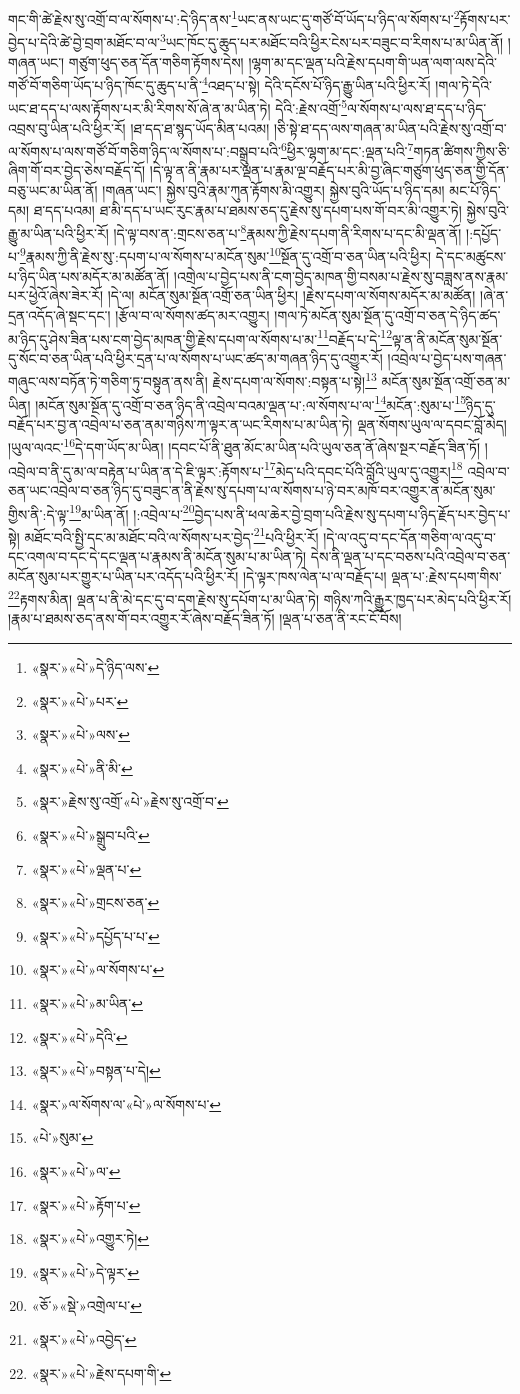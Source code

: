 གང་གི་ཚེ་རྗེས་སུ་འགྲོ་བ་ལ་སོགས་པ་:དེ་ཉིད་ནས་\footnote{«སྣར་»«པེ་»དེ་ཉིད་ལས་}ཡང་ནས་ཡང་དུ་གཙོ་བོ་ཡོད་པ་ཉིད་ལ་སོགས་པ་\footnote{«སྣར་»«པེ་»པར་}རྟོགས་པར་བྱེད་པ་དེའི་ཚེ་བྱེ་བྲག་མཐོང་བ་ལ་\footnote{«སྣར་»«པེ་»ལས་}ཡང་ཁོང་དུ་ཆུད་པར་མཐོང་བའི་ཕྱིར་ངེས་པར་བཟུང་བ་རིགས་པ་མ་ཡིན་ནོ། །གཞན་ཡང་། གཙུག་ཕུད་ཅན་དོན་གཅིག་རྟོགས་དེས། །ལྷག་མ་དང་ལྡན་པའི་རྗེས་དཔག་གི་ཡན་ལག་ལས་དེའི་གཙོ་བོ་གཅིག་ཡོད་པ་ཉིད་ཁོང་དུ་ཆུད་པ་ནི་\footnote{«སྣར་»«པེ་»ནི་མི་}འཐད་པ་སྟེ། དེའི་དངོས་པོ་ཉིད་རྒྱུ་ཡིན་པའི་ཕྱིར་རོ། །གལ་ཏེ་དེའི་ཡང་ཐ་དད་པ་ལས་རྟོགས་པར་མི་རིགས་སོ་ཞེ་ན་མ་ཡིན་ཏེ། དེའི་:རྗེས་འགྲོ་\footnote{«སྣར་»རྗེས་སུ་འགྲོ་«པེ་»རྗེས་སུ་འགྲོ་བ་}ལ་སོགས་པ་ལས་ཐ་དད་པ་ཉིད་འབྲས་བུ་ཡིན་པའི་ཕྱིར་རོ། །ཐ་དད་ཐ་སྙད་ཡོད་མིན་པའམ། །ཅི་སྟེ་ཐ་དད་ལས་གཞན་མ་ཡིན་པའི་རྗེས་སུ་འགྲོ་བ་ལ་སོགས་པ་ལས་གཙོ་བོ་གཅིག་ཉིད་ལ་སོགས་པ་:བསྒྲུབ་པའི་\footnote{«སྣར་»«པེ་»སྒྲུབ་པའི་}ཕྱིར་ལྷག་མ་དང་:ལྡན་པའི་\footnote{«སྣར་»«པེ་»ལྡན་པ་}གཏན་ཚིགས་ཀྱིས་ཅི་ཞིག་གོ་བར་བྱེད་ཅེས་བརྗོད་དོ། །དེ་ལྟ་ན་ནི་རྣམ་པར་ལྡན་པ་རྣམ་ལྔ་བརྗོད་པར་མི་བྱ་ཞིང་གཙུག་ཕུད་ཅན་གྱི་དོན་བཅུ་ཡང་མ་ཡིན་ནོ། །གཞན་ཡང་། སྐྱེས་བུའི་རྣམ་ཀུན་རྟོགས་མི་འགྱུར། སྐྱེས་བུའི་ཡོད་པ་ཉིད་དམ། མང་པོ་ཉིད་དམ། ཐ་དད་པའམ། ཐ་མི་དད་པ་ཡང་རུང་རྣམ་པ་ཐམས་ཅད་དུ་རྗེས་སུ་དཔག་པས་གོ་བར་མི་འགྱུར་ཏེ། སྐྱེས་བུའི་རྒྱུ་མ་ཡིན་པའི་ཕྱིར་རོ། །དེ་ལྟ་བས་ན་:གྲངས་ཅན་པ་\footnote{«སྣར་»«པེ་»གྲངས་ཅན་}རྣམས་ཀྱི་རྗེས་དཔག་ནི་རིགས་པ་དང་མི་ལྡན་ནོ། །:དཔྱོད་པ་\footnote{«སྣར་»«པེ་»དཔྱོད་པ་པ་}རྣམས་ཀྱི་ནི་རྗེས་སུ་:དཔག་པ་ལ་སོགས་པ་མངོན་སུམ་\footnote{«སྣར་»«པེ་»ལ་སོགས་པ་}སྔོན་དུ་འགྲོ་བ་ཅན་ཡིན་པའི་ཕྱིར། དེ་དང་མཚུངས་པ་ཉིད་ཡིན་པས་མདོར་མ་མཚོན་ནོ། །འགྲེལ་པ་བྱེད་པས་ནི་ངག་བྱེད་མཁན་གྱི་བསམ་པ་རྗེས་སུ་བཟླས་ནས་རྣམ་པར་ཕྱེའོ་ཞེས་ཟེར་རོ། །དེ་ལ། མངོན་སུམ་སྔོན་འགྲོ་ཅན་ཡིན་ཕྱིར། །རྗེས་དཔག་ལ་སོགས་མདོར་མ་མཚོན། །ཞེ་ན་དྲན་འདོད་ཞེ་སྡང་དང་། །རྩོལ་བ་ལ་སོགས་ཚད་མར་འགྱུར། །གལ་ཏེ་མངོན་སུམ་སྔོན་དུ་འགྲོ་བ་ཅན་དེ་ཉིད་ཚད་མ་ཉིད་དུ་ཤེས་ཟིན་པས་ངག་བྱེད་མཁན་གྱི་རྗེས་དཔག་ལ་སོགས་པ་མ་\footnote{«སྣར་»«པེ་»མ་ཡིན་}བརྗོད་པ་དེ་\footnote{«སྣར་»«པེ་»དེའི་}ལྟ་ན་ནི་མངོན་སུམ་སྔོན་དུ་སོང་བ་ཅན་ཡིན་པའི་ཕྱིར་དྲན་པ་ལ་སོགས་པ་ཡང་ཚད་མ་གཞན་ཉིད་དུ་འགྱུར་རོ། །འབྲེལ་པ་བྱེད་པས་གཞན་གཞུང་ལས་བཏོན་ཏེ་གཅིག་ཏུ་བསྟུན་ནས་ནི། རྗེས་དཔག་ལ་སོགས་:བསྟན་པ་སྟེ།\footnote{«སྣར་»«པེ་»བསྟན་པ་དེ།} མངོན་སུམ་སྔོན་འགྲོ་ཅན་མ་ཡིན། །མངོན་སུམ་སྔོན་དུ་འགྲོ་བ་ཅན་ཉིད་ནི་འབྲེལ་བའམ་ལྡན་པ་:ལ་སོགས་པ་ལ་\footnote{«སྣར་»ལ་སོགས་ལ་«པེ་»ལ་སོགས་པ་}མངོན་:སུམ་པ་\footnote{«པེ་»སུམ་}ཉིད་དུ་བརྗོད་པར་བྱ་ན་འབྲེལ་པ་ཅན་ནམ་གཉིས་ཀ་ལྟར་ན་ཡང་རིགས་པ་མ་ཡིན་ཏེ། ལྡན་སོགས་ཡུལ་ལ་དབང་བློ་མེད། །ཡུལ་ལའང་\footnote{«སྣར་»«པེ་»ལ་}དེ་དག་ཡོད་མ་ཡིན། །དབང་པོ་ནི་ཐུན་མོང་མ་ཡིན་པའི་ཡུལ་ཅན་ནོ་ཞེས་སྔར་བརྗོད་ཟིན་ཏོ། །འབྲེལ་བ་ནི་དུ་མ་ལ་བརྟེན་པ་ཡིན་ན་དེ་ཇི་ལྟར་:རྟོགས་པ་\footnote{«སྣར་»«པེ་»རྟོག་པ་}མེད་པའི་དབང་པོའི་བློའི་ཡུལ་དུ་འགྱུར།\footnote{«སྣར་»«པེ་»འགྱུར་ཏེ།} འབྲེལ་བ་ཅན་ཡང་འབྲེལ་བ་ཅན་ཉིད་དུ་བཟུང་ན་ནི་རྗེས་སུ་དཔག་པ་ལ་སོགས་པ་ཉེ་བར་མཁོ་བར་འགྱུར་ན་མངོན་སུམ་གྱིས་ནི་:དེ་ལྟ་\footnote{«སྣར་»«པེ་»དེ་ལྟར་}མ་ཡིན་ནོ། །:འབྲེལ་པ་\footnote{«ཅོ་»«སྡེ་»འགྲེལ་པ་}བྱེད་པས་ནི་ཕལ་ཆེར་བྱེ་བྲག་པའི་རྗེས་སུ་དཔག་པ་ཉིད་རྗོད་པར་བྱེད་པ་སྟེ། མཐོང་བའི་སྤྱི་དང་མ་མཐོང་བའི་ལ་སོགས་པར་བྱེད་\footnote{«སྣར་»«པེ་»འབྱེད་}པའི་ཕྱིར་རོ། །དེ་ལ་འདུ་བ་དང་དོན་གཅིག་ལ་འདུ་བ་དང་འགལ་བ་དང་དེ་དང་ལྡན་པ་རྣམས་ནི་མངོན་སུམ་པ་མ་ཡིན་ཏེ། དེས་ནི་ལྡན་པ་དང་བཅས་པའི་འབྲེལ་བ་ཅན་མངོན་སུམ་པར་གྱུར་པ་ཡིན་པར་འདོད་པའི་ཕྱིར་རོ། །དེ་ལྟར་ཁས་ལེན་པ་ལ་བརྗོད་པ། ལྡན་པ་:རྗེས་དཔག་གིས་\footnote{«སྣར་»«པེ་»རྗེས་དཔག་གི་}རྟགས་མིན། ལྡན་པ་ནི་མེ་དང་དུ་བ་དག་རྗེས་སུ་དཔོག་པ་མ་ཡིན་ཏེ། གཉིས་ཀའི་རྒྱུར་ཁྱད་པར་མེད་པའི་ཕྱིར་རོ། །རྣམ་པ་ཐམས་ཅད་ནས་གོ་བར་འགྱུར་རོ་ཞེས་བརྗོད་ཟིན་ཏོ། །ལྡན་པ་ཅན་ནི་རང་ངོ་བོས། 